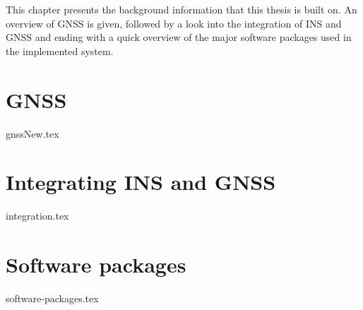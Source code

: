 \graphicspath{{Theory/}}
This chapter presents the background information that this thesis is built on. An overview of GNSS is given, followed by a look into the integration of INS and GNSS and ending with a quick overview of the major software packages used in the implemented system. 

\section{GNSS}
    {gnssNew.tex}

\section{Integrating INS and GNSS}
    {integration.tex}

\section{Software packages}
    {software-packages.tex}
    
    